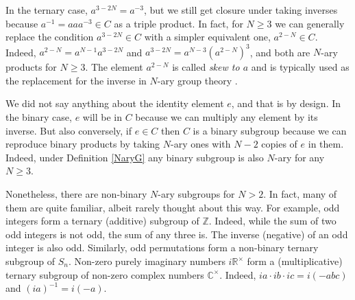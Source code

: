 \documentclass[11pt]{article}
\theoremstyle{plain}
\theoremstyle{definition}
\newcommand{\+}[1]{{#1}^\times}
\def\R{{\mathbb R}}
\def\Z{{\mathbb Z}}
\def\C{{\mathbb C}}
\begin{document}
In the ternary case, $a^{3-2N}=a^{-3}$, but we still get closure under taking inverses because $a^{-1}=aaa^{-3}\in C$ as a triple product. In fact, for $N\geq3$ we can generally replace the condition $a^{3-2N}\in C$ with a simpler equivalent one, $a^{2-N}\in C$. Indeed, $a^{2-N}=a^{N-1}a^{3-2N}$ and $a^{3-2N}=a^{N-3}\left(a^{2-N}\right)^3$, and both are $N$-ary products for $N\geq3$. The element $a^{2-N}$ is called {\it skew to $a$} and is typically used as the replacement for the inverse in $N$-ary group theory \cite{GBV,Shah}. 

We did not say anything about the identity element $e$, and that is by design. In the binary case, $e$ will be in $C$ because we can multiply any element by its inverse. But also conversely, if $e\in C$ then $C$ is a binary subgroup because we can reproduce binary products by taking $N$-ary ones with $N-2$ copies of $e$ in them. Indeed, under Definition \ref{NaryG} any binary subgroup is also $N$-ary for any $N\geq3$. 

Nonetheless, there are non-binary $N$-ary subgroups for $N>2$. In fact, many of them are quite familiar, albeit rarely thought about this way. For example, odd integers form a ternary (additive) subgroup of $\Z$. Indeed, while the sum of two odd integers is not odd, the sum of any three is. The inverse (negative) of an odd integer is also odd. Similarly, odd permutations form a non-binary ternary subgroup of $S_n$. Non-zero purely imaginary numbers $i\+{\R}$ form a (multiplicative) ternary subgroup of non-zero complex numbers $\+{\C}$. Indeed, $ia\cdot ib\cdot ic=i(-abc)$ and $(ia)^{-1}=i(-a)$.
\end{document}
